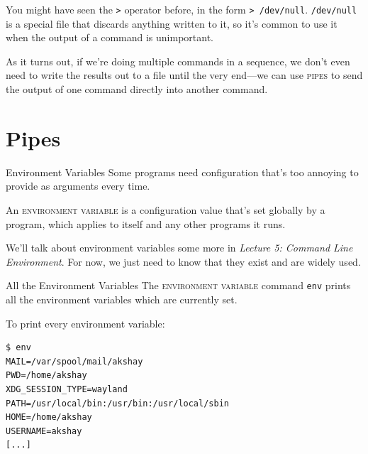You might have seen the \texttt{>} operator before, in the form
\texttt{> /dev/null}.  \texttt{/dev/null} is a special file that
discards anything written to it, so it's common to use it when the output of a
command is unimportant.

As it turns out, if we're doing multiple commands in a sequence, we don't even
need to write the results out to a file until the very end---we can use
\textsc{pipes} to send the output of one command directly into another command.

\section{Pipes}

\begin{frame}[fragile]{Environment Variables}
  Some programs need configuration that's too annoying to provide as arguments
  every time.
  \pause
  \begin{definition}
    An \textsc{environment variable} is a configuration value that's set
    globally by a program, which applies to itself and any other programs it
    runs.
  \end{definition}
\end{frame}

We'll talk about environment variables some more in \textit{Lecture 5: Command
Line Environment}.  For now, we just need to know that they exist and are
widely used.

\begin{frame}[fragile]{All the Environment Variables}
  \alert<1>{The \textsc{environment variable} command \texttt{env} prints all the
  environment variables which are currently set.}
  \pause
  \begin{example}[env]
    To print every environment variable:
  \begin{verbatim}
$ env
MAIL=/var/spool/mail/akshay
PWD=/home/akshay
XDG_SESSION_TYPE=wayland
PATH=/usr/local/bin:/usr/bin:/usr/local/sbin
HOME=/home/akshay
USERNAME=akshay
[...]
  \end{verbatim}
  \end{example}
\end{frame}

